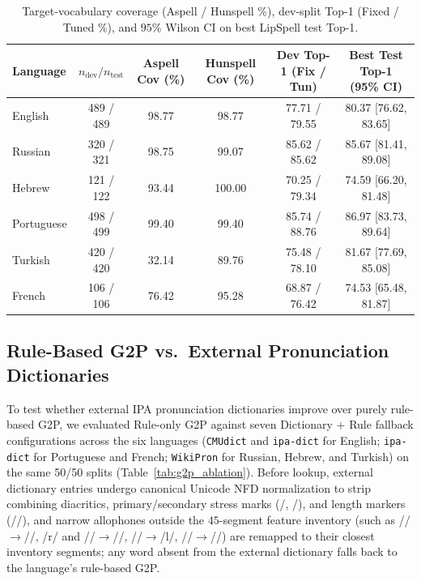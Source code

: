 \documentclass[preprint,12pt,authoryear]{elsarticle}
\begin{document}
\begin{table}[ht]
\centering
\scriptsize
\caption{Target-vocabulary coverage (Aspell / Hunspell \%), dev-split Top-1 (Fixed / Tuned \%), and $95\%$ Wilson CI on best LipSpell test Top-1.}
\label{tab:multilingual_cov}
\begin{tabular}{lccccc}
\toprule
Language & $n_{\text{dev}} / n_{\text{test}}$ & Aspell Cov (\%) & Hunspell Cov (\%) & Dev Top-1 (Fix / Tun) & Best Test Top-1 (95\% CI) \\
\midrule
English    & 489 / 489 & 98.77 & 98.77 & 77.71 / 79.55 & 80.37 [76.62, 83.65] \\
Russian    & 320 / 321 & 98.75 & 99.07 & 85.62 / 85.62 & 85.67 [81.41, 89.08] \\
Hebrew     & 121 / 122 & 93.44 & 100.00 & 70.25 / 79.34 & 74.59 [66.20, 81.48] \\
Portuguese & 498 / 499 & 99.40 & 99.40 & 85.74 / 88.76 & 86.97 [83.73, 89.64] \\
Turkish    & 420 / 420 & 32.14 & 89.76 & 75.48 / 78.10 & 81.67 [77.69, 85.08] \\
French     & 106 / 106 & 76.42 & 95.28 & 68.87 / 76.42 & 74.53 [65.48, 81.87] \\
\bottomrule
\end{tabular}
\end{table}

\subsection{Rule-Based G2P vs.\ External Pronunciation Dictionaries}
To test whether external IPA pronunciation dictionaries improve over purely rule-based G2P, we evaluated Rule-only G2P against seven Dictionary + Rule fallback configurations across the six languages (\texttt{CMUdict} and \texttt{ipa-dict} \citep{opendictipadict} for English; \texttt{ipa-dict} for Portuguese and French; \texttt{WikiPron} \citep{lee2020wikipron} for Russian, Hebrew, and Turkish) on the same 50/50 splits (Table~\ref{tab:g2p_ablation}). Before lookup, external dictionary entries undergo canonical Unicode NFD normalization to strip combining diacritics, primary/secondary stress marks (/\textprimstress, \textsecstress/), and length markers (/\textlengthmark/), and narrow allophones outside the $45$-segment feature inventory (such as /\textinvscr/$\rightarrow$/\textturnr/, /r/ and //$\rightarrow$/\textfishhookr/, /\textltilde/$\rightarrow$/l/, /\textgamma/$\rightarrow$//) are remapped to their closest inventory segments; any word absent from the external dictionary falls back to the language's rule-based G2P.
\end{document}
